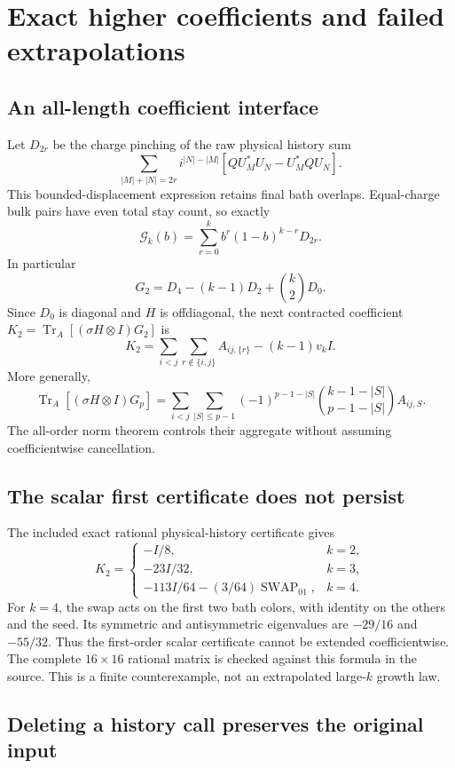 \documentclass[11pt]{article}
\newcommand{\Tr}{\operatorname{Tr}}
\newcommand{\SWAP}{\operatorname{SWAP}}
\begin{document}
\section{Exact higher coefficients and failed extrapolations}
\label{sec:failures}

\subsection{An all-length coefficient interface}

Let \(D_{2r}\) be the charge pinching of the raw physical history sum
\[
 \sum_{|M|+|N|=2r}i^{|N|-|M|}
       [QU_M^*U_N-U_M^*QU_N].
\]
This bounded-displacement expression retains final bath overlaps.
Equal-charge bulk pairs have even total stay count, so exactly
\[
 \mathcal G_k(b)=\sum_{r=0}^k b^r(1-b)^{k-r}D_{2r}.
\]
In particular
\[
 G_2=D_4-(k-1)D_2+\binom{k}{2}D_0.
\]
Since \(D_0\) is diagonal and \(H\) is offdiagonal, the next contracted
coefficient \(K_2=\Tr_A[(\sigma H\otimes I)G_2]\) is
\begin{equation}\label{eq:K2}
 K_2=\sum_{i<j}\sum_{r\notin\{i,j\}}A_{ij,\{r\}}
                  -(k-1)v_kI.
\end{equation}
More generally,
\[
 \Tr_A[(\sigma H\otimes I)G_p]
 =
 \sum_{i<j}\sum_{|S|\le p-1}
 (-1)^{p-1-|S|}
 \binom{k-1-|S|}{p-1-|S|}A_{ij,S}.
\]
The all-order norm theorem controls their aggregate without assuming
coefficientwise cancellation.

\subsection{The scalar first certificate does not persist}

The included exact rational physical-history certificate gives
\[
 K_2=
 \begin{cases}
 -I/8,&k=2,\\
 -23I/32,&k=3,\\
 -113I/64-(3/64)\SWAP_{01},&k=4.
 \end{cases}
\]
For \(k=4\), the swap acts on the first two bath colors, with identity on
the others and the seed. Its symmetric and antisymmetric eigenvalues are
\(-29/16\) and \(-55/32\). Thus the first-order scalar certificate cannot
be extended coefficientwise. The complete \(16\times16\) rational matrix
is checked against this formula in the source. This is a finite
counterexample, not an extrapolated large-\(k\) growth law.

\subsection{Deleting a history call preserves the original input}
\end{document}
